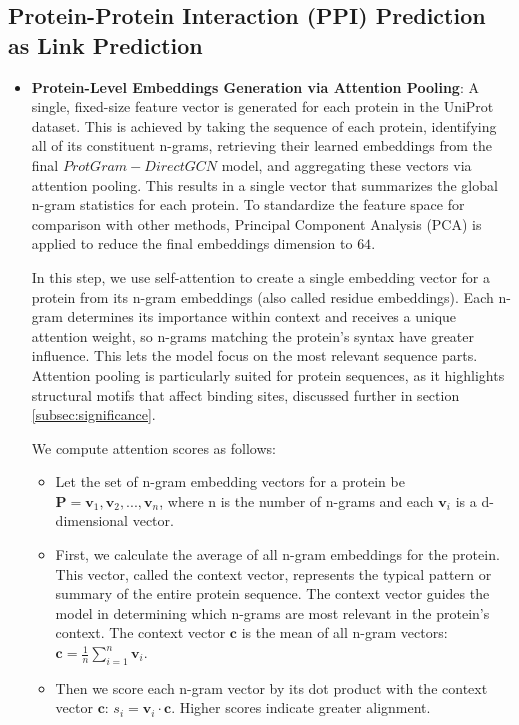 \documentclass[utf8]{FrontiersinHarvard}
\begin{document}
	\subsection{Protein-Protein Interaction (PPI) Prediction as Link Prediction}
	\label{subsec:link}
	\begin{itemize}
		\item \textbf{Protein-Level Embeddings Generation via Attention Pooling}: A single, fixed-size feature vector is generated for each protein in the UniProt dataset. This is achieved by taking the sequence of each protein, identifying all of its constituent n-grams, retrieving their learned embeddings from the final $ProtGram-DirectGCN$ model, and aggregating these vectors via attention pooling. This results in a single vector that summarizes the global n-gram statistics for each protein. To standardize the feature space for comparison with other methods, Principal Component Analysis (PCA) is applied to reduce the final embeddings dimension to $64$.
		
		In this step, we use self-attention to create a single embedding vector for a protein from its n-gram embeddings (also called residue embeddings). Each n-gram determines its importance within context and receives a unique attention weight, so n-grams matching the protein's syntax have greater influence. This lets the model focus on the most relevant sequence parts. Attention pooling is particularly suited for protein sequences, as it highlights structural motifs that affect binding sites, discussed further in section \ref{subsec:significance}.
		
		We compute attention scores as follows:
		\begin{itemize}
			\item Let the set of n-gram embedding vectors for a protein be $\mathbf{P} = {\mathbf{v}_1, \mathbf{v}_2, ..., \mathbf{v}_n}$, where n is the number of n-grams and each $\mathbf{v}_i$ is a d-dimensional vector.
			
			\item First, we calculate the average of all n-gram embeddings for the protein. This vector, called the context vector, represents the typical pattern or summary of the entire protein sequence. The context vector guides the model in determining which n-grams are most relevant in the protein's context. The context vector $\mathbf{c}$ is the mean of all n-gram vectors: $\mathbf{c} = \frac{1}{n} \sum_{i=1}^{n} \mathbf{v}_i.$
			
			\item Then we score each n-gram vector by its dot product with the context vector $\mathbf{c}$: $s_i = \mathbf{v}_i \cdot \mathbf{c}$. Higher scores indicate greater alignment.
			

\end{itemize}
\end{itemize}
\end{document}
